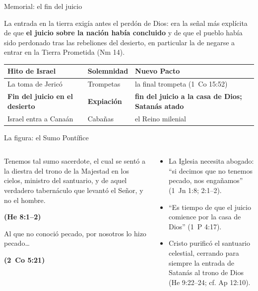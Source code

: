 \documentclass[hyperref={bookmarks=false},aspectratio=169]{beamer}
\newcommand{\fuente}[1]{\par\hfill{\upshape\bfseries\footnotesize\textcolor{tierraroja}{#1}}}
\newcommand{\destacar}[1]{\textbf{\textcolor{tierraroja}{#1}}}
\begin{document}
\begin{frame}{Memorial: el fin del juicio}
{\scriptsize La entrada en la tierra exigía antes el perdón de Dios: era la señal más explícita de que \destacar{el juicio sobre la nación había concluido} y de que el pueblo había sido perdonado tras las rebeliones del desierto, en particular la de negarse a entrar en la Tierra Prometida (Nm 14).\par\smallskip}
\scriptsize\renewcommand{\arraystretch}{1.1}
\begin{tabular}{@{}L{3.5cm}L{2.0cm}L{5.6cm}@{}}
\toprule
\textbf{Hito de Israel} & \textbf{Solemnidad} & \textbf{Nuevo Pacto} \\ \midrule
La toma de Jericó & Trompetas & la final trompeta (1~Co 15:52) \\
\textbf{Fin del juicio en el desierto} & \textbf{Expiación} & \textbf{fin del juicio a la casa de Dios; Satanás atado} \\
Israel entra a Canaán & Cabañas & el Reino milenial \\
\bottomrule
\end{tabular}
\end{frame}

\begin{frame}{La figura: el Sumo Pontífice}
\begin{columns}[t,onlytextwidth]
\begin{column}{0.50\textwidth}
\begin{cita}[fontupper=\scriptsize\itshape]Tenemos tal sumo sacerdote, el cual se sentó a la diestra del trono de la Majestad en los cielos, ministro del santuario, y de aquel verdadero tabernáculo que levantó el Señor, y no el hombre.\fuente{(He 8:1--2)}\end{cita}
\begin{cita}[fontupper=\scriptsize\itshape]Al que no conoció pecado, por nosotros lo hizo pecado\ldots\fuente{(2~Co 5:21)}\end{cita}
\end{column}
\begin{column}{0.48\textwidth}\scriptsize
\begin{itemize}
\item La Iglesia necesita abogado: ``si decimos que no tenemos pecado, nos engañamos'' (1~Jn 1:8; 2:1--2).
\item ``Es tiempo de que el juicio comience por la casa de Dios'' (1~P 4:17).
\item Cristo purificó el santuario celestial, cerrando para siempre la entrada de Satanás al trono de Dios (He 9:22--24; cf. Ap 12:10).
\end{itemize}
\end{column}
\end{columns}
\end{frame}
\end{document}
